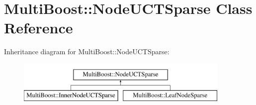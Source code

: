 \hypertarget{classMultiBoost_1_1NodeUCTSparse}{\section{Multi\-Boost\-:\-:Node\-U\-C\-T\-Sparse Class Reference}
\label{classMultiBoost_1_1NodeUCTSparse}
}
Inheritance diagram for Multi\-Boost\-:\-:Node\-U\-C\-T\-Sparse\-:\begin{figure}[H]
\begin{center}
\leavevmode
\includegraphics[height=2.000000cm]{classMultiBoost_1_1NodeUCTSparse}
\end{center}
\end{figure}
